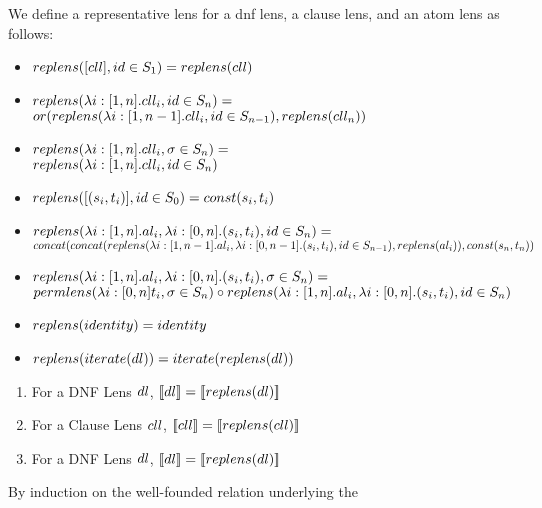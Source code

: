 \begin{definition}[replens]
We define a representative lens for a dnf lens, a clause lens, and an atom lens as follows:
\begin{itemize}
\item $replens([cll],id\in S_1) = replens(cll)$
\item $replens(\lambda i:[1,n].cll_i,id\in S_n) =$\\
$or(replens(\lambda i:[1,n-1].cll_i, id\in S_{n-1}),replens(cll_n))$
\item $replens(\lambda i:[1,n].cll_i,\sigma\in S_n) =$\\
$replens(\lambda i:[1,n].cll_i,id\in S_n)$
\item $replens([(s_i,t_i)],id\in S_0)=const(s_i,t_i)$
\item $replens(\lambda i:[1,n].al_i,\lambda i:[0,n].(s_i,t_i),id\in S_n)=$\\
$concat(concat(replens(\lambda i:[1,n-1].al_i,\lambda i:[0,n-1].(s_i,t_i),id\in S_{n-1}),replens(al_i)),const(s_n,t_n))$
\item $replens(\lambda i:[1,n].al_i,\lambda i:[0,n].(s_i,t_i),\sigma \in S_n)=$\\
$permlens(\lambda i:[0,n] t_i,\sigma \in S_n) \circ replens(\lambda i:[1,n].al_i,\lambda i:[0,n].(s_i,t_i),id \in S_n)$
\item $replens(identity)=identity$
\item $replens(iterate(dl))=iterate(replens(dl))$
\end{itemize}
\end{definition}

\begin{lemma}\leavevmode
\begin{enumerate}
\item For a DNF Lens $dl$, $[ \! [dl] \! ]=[ \! [replens(dl)] \! ]$
\item For a Clause Lens $cll$, $[ \! [cll] \! ]=[ \! [replens(cll)] \! ]$
\item For a DNF Lens $dl$, $[ \! [dl] \! ]=[ \! [replens(dl)] \! ]$
\end{enumerate}
By induction on the well-founded relation underlying the 
\end{lemma}

